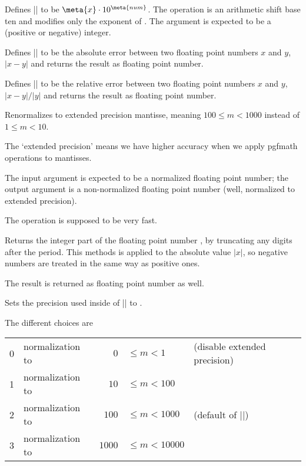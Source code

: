 \begin{command}{}
	Defines |\pgfmathresult| to be $\meta{x} \cdot 10^{\meta{num}}$. The operation is an arithmetic shift base ten and modifies only the exponent of . The argument  is expected to be a (positive or negative) integer.
\end{command}


\begin{command}{\pgfmathfloatabserror{}}
	Defines |\pgfmathresult| to be the absolute error between two floating point numbers $x$ and $y$, $\lvert x - y\rvert $ and returns the result as floating point number.
\end{command}

\begin{command}{\pgfmathfloatrelerror{}}
	Defines |\pgfmathresult| to be the relative error between two floating point numbers $x$ and $y$, $\lvert x - y\rvert / \lvert y \rvert $ and returns the result as floating point number.
\end{command}
\begin{command}{}
Renormalizes  to extended precision mantisse, meaning
$100 \le m < 1000$ instead of $1 \le m < 10$.

The `extended precision' means we have higher accuracy when we apply pgfmath operations to mantisses.

The input argument is expected to be a normalized floating point number; the output argument is a non-normalized floating point number (well, normalized to extended precision).

The operation is supposed to be very fast.
\end{command}
\begin{command}{\pgfmathfloatint{}}
Returns the integer part of the floating point number , by truncating any digits after the period. This methods is applied to the absolute value $\rvert x \lvert$, so negative numbers are treated in the same way as positive ones.

The result is returned as floating point number as well.
\end{command}

\begin{command}{\pgfmathfloatsetextprecision{}}
	Sets the precision used inside of |\pgfmathfloattoextentedprecision| to .

	The different choices are
	
	\begin{tabular}{llrll}
	0 & normalization to &    $0$ & $\le m < 1$ 	& (disable extended precision)\\
	1 & normalization to &   $10$ & $\le m < 100$	\\
	2 & normalization to & 	$100$ & $\le m < 1000$	& (default of |\pgfmathfloattoextentedprecision|)\\
	3 & normalization to & $1000$ & $\le m < 10000$	\\
	\end{tabular}
\end{command}

